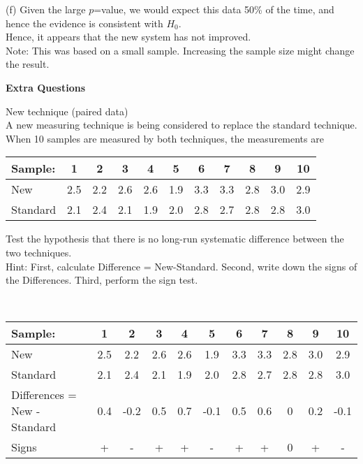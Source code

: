 \documentclass[bigtut]{tutorial}\usepackage[]{graphicx}\usepackage[]{color}
\begin{document}
\begin{tutorial}
\begin{questions}
\begin{solution}
(f)
 Given the large $p$=value, we would expect this data 50\% of the time, and hence the evidence is consistent with $H_{0}$. \\
Hence, it appears that the new system has  not improved. \\
Note: This was based on a small sample. Increasing the sample size might change the result.
\end{solution}








\newpage
\hspace{-1cm} {\bf Extra Questions}


\question New technique (paired data) \\

A new measuring technique is being considered to replace the standard technique. When 10 samples are measured by both techniques, the measurements are \\
\begin{center}
\begin{tabular}{|l|cccccccccc|}\hline
 Sample\/: &1&2&3&4&5&6&7&8&9&10\\ \hline
New      &2.5 &2.2 &2.6 &2.6 &1.9 &3.3 &3.3 &2.8 &3.0 &2.9\\
Standard &2.1 &2.4 &2.1 &1.9 &2.0 &2.8 &2.7 &2.8 &2.8 &3.0\\ \hline
\end{tabular}
 \end{center}

\vspace{.5cm}
Test the hypothesis that there is no long-run systematic difference between the two techniques. \\

Hint: First, calculate Difference = New-Standard. Second, write down the signs of the Differences. Third, perform the sign test.

\begin{solution}
 \\

\begin{tabular}{|l|cccccccccc|}\hline
 Sample\/: &1&2&3&4&5&6&7&8&9&10\\ \hline
New      &2.5 &2.2 &2.6 &2.6 &1.9 &3.3 &3.3 &2.8 &3.0 &2.9\\
Standard &2.1 &2.4 &2.1 &1.9 &2.0 &2.8 &2.7 &2.8 &2.8 &3.0 \\ 
Differences = New - Standard & 0.4 & -0.2 & 0.5 & 0.7 & -0.1 & 0.5 & 0.6 & 0 & 0.2 & -0.1 \\
Signs & + & - & + & + & - & + & + & 0 & + & - \\ \hline
\end{tabular}


\end{solution}
\end{questions}
\end{tutorial}
\end{document}
